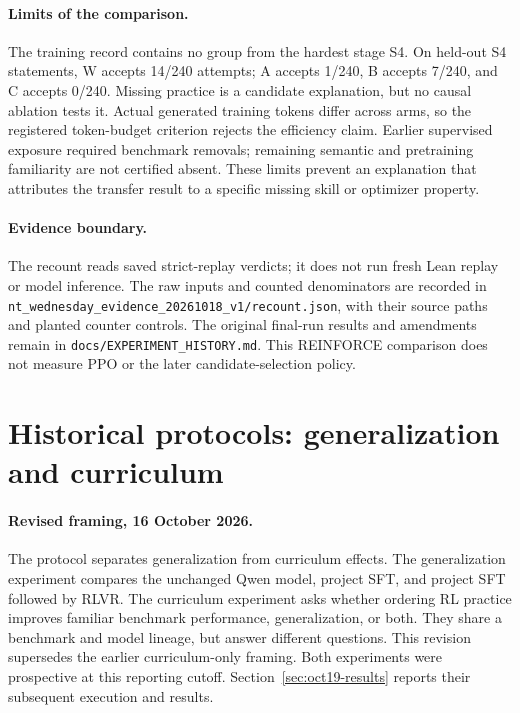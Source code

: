 \documentclass[11pt]{article}
\newcommand{\pth}[1]{\nolinkurl{#1}}
\begin{document}
\paragraph{Limits of the comparison.}
The training record contains no group from the hardest stage S4.
On held-out S4 statements, W accepts 14/240 attempts; A accepts 1/240, B accepts 7/240, and C accepts 0/240.
Missing practice is a candidate explanation, but no causal ablation tests it.
Actual generated training tokens differ across arms, so the registered token-budget criterion rejects the efficiency claim.
Earlier supervised exposure required benchmark removals; remaining semantic and pretraining familiarity are not certified absent.
These limits prevent an explanation that attributes the transfer result to a specific missing skill or optimizer property.

\paragraph{Evidence boundary.}
The recount reads saved strict-replay verdicts; it does not run fresh Lean replay or model inference.
The raw inputs and counted denominators are recorded in \pth{nt_wednesday_evidence_20261018_v1/recount.json}, with their source paths and planted counter controls.
The original final-run results and amendments remain in \pth{docs/EXPERIMENT_HISTORY.md}.
This REINFORCE comparison does not measure PPO or the later candidate-selection policy.

\section{Historical protocols: generalization and curriculum}
\label{sec:curriculum-generalization}

\paragraph{Revised framing, 16 October 2026.}
The protocol separates generalization from curriculum effects.
The generalization experiment compares the unchanged Qwen model, project SFT, and project SFT followed by RLVR.
The curriculum experiment asks whether ordering RL practice improves familiar benchmark performance, generalization, or both.
They share a benchmark and model lineage, but answer different questions.
This revision supersedes the earlier curriculum-only framing.
Both experiments were prospective at this reporting cutoff.
Section~\ref{sec:oct19-results} reports their subsequent execution and results.
\end{document}
